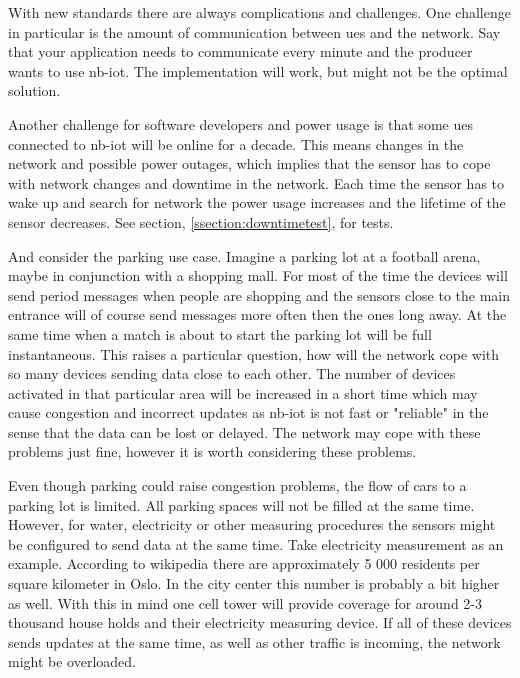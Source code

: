 \documentclass[USenglish]{ifimaster}  %
\begin{document}
With new standards there are always complications and challenges. One challenge in particular is the amount of communication between \acrshort{ue}s and the network. Say that your application needs to communicate every minute and the producer wants to use \acrshort{nb-iot}. The implementation will work, but might not be the optimal solution.

Another challenge for software developers and power usage is that some \acrshort{ue}s connected to \acrshort{nb-iot} will be online for a decade. This means changes in the network and possible power outages, which implies that the sensor has to cope with network changes and downtime in the network. Each time the sensor has to wake up and search for network the power usage increases and the lifetime of the sensor decreases. See section, \vref{ssection:downtimetest}, for tests.

And consider the parking use case. Imagine a parking lot at a football arena, maybe in conjunction with a shopping mall. For most of the time the devices will send period messages when people are shopping and the sensors close to the main entrance will of course send messages more often then the ones long away. At the same time when a match is about to start the parking lot will be full instantaneous. This raises a particular question, how will the network cope with so many devices sending data close to each other. The number of devices activated in that particular area will be increased in a short time which may cause congestion and incorrect updates as \acrshort{nb-iot} is not fast or "reliable" in the sense that the data can be lost or delayed. The network may cope with these problems just fine, however it is worth considering these problems.


Even though parking could raise congestion problems, the flow of cars to a parking lot is limited. All parking spaces will not be filled at the same time. However, for water, electricity or other measuring procedures the sensors might be configured to send data at the same time. Take electricity measurement as an example. According to wikipedia \cite{online:avgpeople} there are approximately 5 000 residents per square kilometer in Oslo. In the city center this number is probably a bit higher as well. With this in mind one cell tower will provide coverage for around 2-3 thousand house holds and their electricity measuring device. If all of these devices sends updates at the same time, as well as other traffic is incoming, the network might be overloaded.
\end{document}
